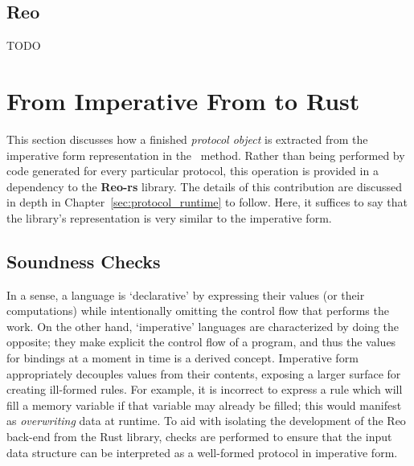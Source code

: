 \subsection{Reo}
TODO

\section{From Imperative From to Rust}
This section discusses how a finished \textit{protocol object} is extracted from the imperative form representation in the~ method. 
Rather than being performed by code generated for every particular protocol, this operation is provided in a dependency to the \textbf{Reo-rs} library. The details of this contribution are discussed in depth in Chapter~\ref{sec:protocol_runtime} to follow. Here, it suffices to say that the library's representation is very similar to the imperative form.

\subsection{Soundness Checks}
In a sense, a language is `declarative' by expressing their values (or their computations) while intentionally omitting the control flow that performs the work. On the other hand, `imperative' languages are characterized by doing the opposite; they make explicit the control flow of a program, and thus the values for bindings at a moment in time is a derived concept. Imperative form appropriately decouples values from their contents, exposing a larger surface for creating ill-formed rules. For example, it is incorrect to express a rule which will fill a memory variable if that variable may already be filled; this would manifest as \textit{overwriting} data at runtime. To aid with isolating the development of the Reo back-end from the Rust library, checks are performed to ensure that the input data structure can be interpreted as a well-formed protocol in imperative form. 

